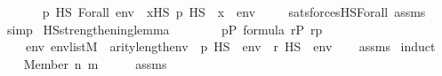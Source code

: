 \begin{isabellebody}
\ \ \isanewline
\ \ \ \ {\isachardoublequoteopen}{\isacharparenleft}{\kern0pt}p\ {\isasymtturnstile}HS\ Forall{\isacharparenleft}{\kern0pt}{\isasymphi}{\isacharparenright}{\kern0pt}\ env{\isacharparenright}{\kern0pt}\ {\isasymlongleftrightarrow}\ {\isacharparenleft}{\kern0pt}{\isasymforall}x{\isasymin}HS{\isachardot}{\kern0pt}\ {\isacharparenleft}{\kern0pt}p\ {\isasymtturnstile}HS\ {\isasymphi}\ {\isacharparenleft}{\kern0pt}{\isacharbrackleft}{\kern0pt}x{\isacharbrackright}{\kern0pt}\ {\isacharat}{\kern0pt}\ env{\isacharparenright}{\kern0pt}{\isacharparenright}{\kern0pt}{\isacharparenright}{\kern0pt}{\isachardoublequoteclose}\isanewline
%
\isadelimproof
\ \ \ %
\endisadelimproof
%
\isatagproof
{}\isamarkupfalse%
\ sats{\isacharunderscore}{\kern0pt}forcesHS{\isacharunderscore}{\kern0pt}Forall{\isacharprime}{\kern0pt}\ assms\ \isamarkupfalse%
\ simp%
\endisatagproof
{\isafoldproof}%
%
\isadelimproof
\isanewline
%
\endisadelimproof
\isanewline
{}\isamarkupfalse%
\ HS{\isacharunderscore}{\kern0pt}strengthening{\isacharunderscore}{\kern0pt}lemma{\isacharcolon}{\kern0pt}\isanewline
\ \ \ \isanewline
\ \ \ \ {\isachardoublequoteopen}p{\isasymin}P{\isachardoublequoteclose}\ {\isachardoublequoteopen}{\isasymphi}{\isasymin}formula{\isachardoublequoteclose}\ {\isachardoublequoteopen}r{\isasymin}P{\isachardoublequoteclose}\ {\isachardoublequoteopen}r{\isasympreceq}p{\isachardoublequoteclose}\isanewline
\ \ \isanewline
\ \ \ \ {\isachardoublequoteopen}{\isasymAnd}env{\isachardot}{\kern0pt}\ env{\isasymin}list{\isacharparenleft}{\kern0pt}M{\isacharparenright}{\kern0pt}\ {\isasymLongrightarrow}\ arity{\isacharparenleft}{\kern0pt}{\isasymphi}{\isacharparenright}{\kern0pt}{\isasymle}length{\isacharparenleft}{\kern0pt}env{\isacharparenright}{\kern0pt}\ {\isasymLongrightarrow}\ p\ {\isasymtturnstile}HS\ {\isasymphi}\ env\ {\isasymLongrightarrow}\ r\ {\isasymtturnstile}HS\ {\isasymphi}\ env{\isachardoublequoteclose}\isanewline
%
\isadelimproof
\ \ %
\endisadelimproof
%
\isatagproof
{}\isamarkupfalse%
\ assms{\isacharparenleft}{\kern0pt}{}{\isacharparenright}{\kern0pt}\isanewline
{}\isamarkupfalse%
\ {\isacharparenleft}{\kern0pt}induct{\isacharparenright}{\kern0pt}\isanewline
\ \ \isamarkupfalse%
\ {\isacharparenleft}{\kern0pt}Member\ n\ m{\isacharparenright}{\kern0pt}\isanewline
\ \ \isamarkupfalse%
\ \isamarkupfalse%
\ assms{}\ {\isacharcolon}{\kern0pt}\ \isanewline

\end{isabellebody}
